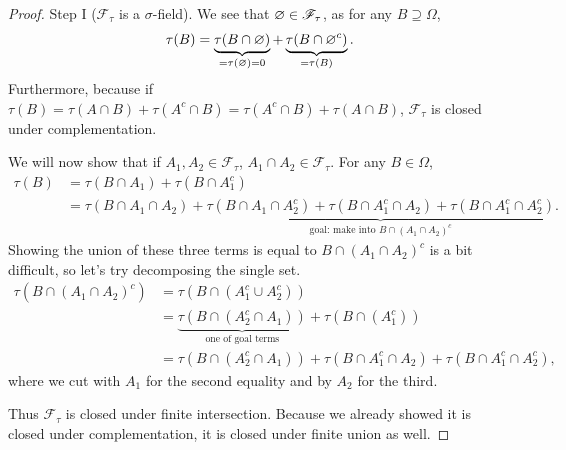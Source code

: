 \begin{proof}
	Step I ($\mathscr{F}_\tau$ is a $\sigma$-field). We see that $\varnothing \in \mathscr{F}_\tau$, as for any $B \supseteq \Omega$, \[
		\tau(B) = \underbrace{\tau(B \cap \varnothing)}_{= \tau(\varnothing) = 0} + \underbrace{\tau(B \cap \varnothing^{c})}_{=\tau(B)}
	.\] Furthermore, because if $\tau(B) = \tau(A \cap B) + \tau(A^{c} \cap B) = \tau(A^{c} \cap B) + \tau(A \cap B)$, $\mathscr{F}_\tau$ is closed under complementation.

	We will now show that if $A_1,A_2 \in \mathscr{F}_\tau$, $A_1 \cap A_2 \in \mathscr{F}_\tau$. For any $B \in \Omega$, 
	\begin{align*}
		\tau(B) &= \tau(B \cap A_1) + \tau(B \cap A_1^{c}) \\
				&= \tau(B\cap A_1 \cap A_2) + \underbrace{\tau(B\cap A_1 \cap A_2^{c}) + \tau(B \cap A_1^{c} \cap A_2) + \tau(B \cap A_1^{c} \cap A_2^{c})}_{\text{goal: make into } B \cap \left( A_1\cap A_2 \right)^{c}}
	.\end{align*}
	Showing the union of these three terms is equal to $B \cap \left( A_1 \cap A_2 \right)^{c}$ is a bit difficult, so let's try decomposing the single set. 
	\begin{align*}
		\tau\left(B \cap \left( A_1 \cap A_2 \right)^{c}\right) &= \tau \left( B \cap \left( A_1^{c} \cup A_2^{c} \right) \right) \\
																&= \underbrace{\tau \left( B \cap (A_2^{c} \cap A_1 )\right)}_{\text{one of goal terms}} + \tau \left( B \cap \left( A_1^{c} \right) \right) \\
		&= \tau\left(B \cap \left( A_2^{c} \cap A_1 \right)\right) + \tau (B \cap A_1^{c} \cap A_2) + \tau (B \cap A_1^{c} \cap A_2^{c})
	,\end{align*}
	where we cut with $A_1$ for the second equality and by $A_2$ for the third.

	Thus $\mathscr{F}_\tau$ is closed under finite intersection. Because we already showed it is closed under complementation, it is closed under finite union as well.


\end{proof}
